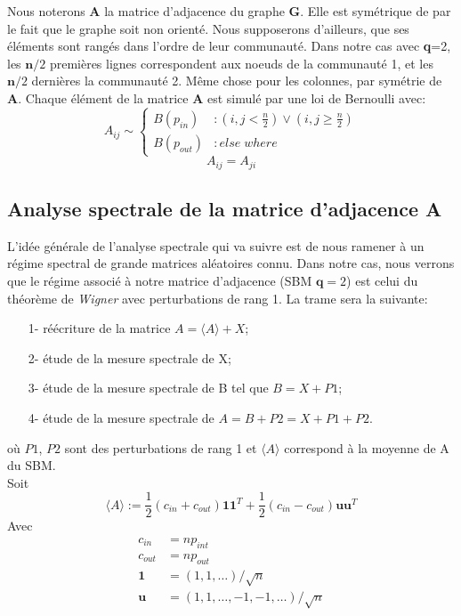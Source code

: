 Nous noterons \textbf{A} la matrice d'adjacence du graphe \textbf{G}.
Elle est symétrique de par le fait que le graphe soit non orienté.
Nous supposerons d'ailleurs, que ses éléments sont rangés dans l'ordre de leur communauté.
Dans notre cas avec \textbf{q}=2, les $\mathbf{n}/2$ premières lignes correspondent aux noeuds de la communauté 1, et les $\mathbf{n}/2$ dernières la communauté 2.
Même chose pour les colonnes, par symétrie de \textbf{A}.
Chaque élément de la matrice \textbf{A} est simulé par une loi de Bernoulli avec: 
\begin{equation} 
 A_{ij} \sim \left\{
  \begin{array}{lr}
    B(p_{in}) & : (i,j < \frac{n}{2}) \lor (i,j \ge \frac{n}{2}) \\
    B(p_{out}) & : else \; where
  \end{array}
\right.\nonumber
\end{equation}
\begin{equation} 
A_{ij} = A_{ji}\nonumber
\end{equation}


\subsection{Analyse spectrale de la matrice d'adjacence \textbf{A}}\label{ch:Analyse spectrale de la matrice d'adjacence}
L'idée générale de l'analyse spectrale qui va suivre est de nous ramener à un régime spectral de grande matrices aléatoires connu. 
Dans notre cas, nous verrons que le régime associé à notre matrice d'adjacence (SBM $\textbf{q}=2$) est celui du théorème de \textit{Wigner} avec perturbations de rang 1.
La trame sera la suivante:
\begin{itemize}
 	\item[1-] réécriture de la matrice $A = \langle A \rangle + X$;
 	\item[2-] étude de la mesure spectrale de X;
 	\item[3-] étude de la mesure spectrale de B tel que $B = X + P1$;
 	\item[4-] étude de la mesure spectrale de $A = B + P2 = X + P1 + P2$.
 \end{itemize} 
où $P1$, $P2$ sont des perturbations de rang 1 et $\langle A \rangle$ correspond à la moyenne de A du SBM.\\

Soit
\begin{equation} 
\langle A \rangle := \frac{1}{2}(c_{in} + c_{out})\mathbf{11}^T + \frac{1}{2}(c_{in} - c_{out})\mathbf{uu}^T \label{eq:1}
\end{equation}
Avec
\begin{align*}
c_{in} &= np_{int} \\
c_{out} &= np_{out}\\
\mathbf{1} &= (1, 1, \ldots)/\sqrt{n}\\
\mathbf{u} &= (1, 1, \ldots, -1, -1, \ldots)/\sqrt{n}
\end{align*}

